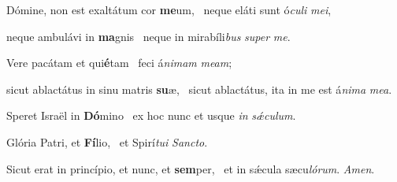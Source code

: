 \item Dómine, non est exaltátum cor \textbf{me}um,~\psstar{} neque eláti sunt ó\textit{culi} \textit{mei},

\item neque ambulávi in \textbf{ma}gnis~\psstar{} neque in mirabíli\textit{bus} \textit{super} \textit{me}.

\item Vere pacátam et qui\textbf{é}tam~\psstar{} feci á\textit{nimam} \textit{meam};

\item sicut ablactátus in sinu matris \textbf{su}æ,~\psstar{} sicut ablactátus, ita in me est á\textit{nima} \textit{mea}.

\item Speret Israël in \textbf{Dó}mino~\psstar{} ex hoc nunc et usque \textit{in} \textit{sǽculum}.

\item Glória Patri, et \textbf{Fí}lio,~\psstar{} et Spirí\textit{tui} \textit{Sancto}.

\item Sicut erat in princípio, et nunc, et \textbf{sem}per,~\psstar{} et in sǽcula sæcu\textit{lórum}. \textit{Amen}.